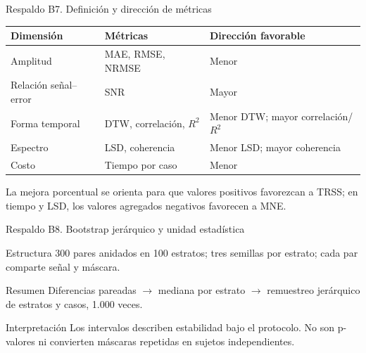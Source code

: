 \documentclass[aspectratio=169,10pt]{beamer}
\begin{document}
\begin{frame}{Respaldo B7. Definición y dirección de métricas}
\small
\begin{tabular}{@{}lll@{}}
\toprule
\textbf{Dimensión} & \textbf{Métricas} & \textbf{Dirección favorable}\\
\midrule
Amplitud & MAE, RMSE, NRMSE & Menor\\
Relación señal--error & SNR & Mayor\\
Forma temporal & DTW, correlación, $R^2$ & Menor DTW; mayor correlación/$R^2$\\
Espectro & LSD, coherencia & Menor LSD; mayor coherencia\\
Costo & Tiempo por caso & Menor\\
\bottomrule
\end{tabular}
\vspace{0.6em}
La mejora porcentual se orienta para que valores positivos favorezcan a TRSS; en tiempo y LSD, los valores agregados negativos favorecen a MNE.
\end{frame}

\begin{frame}{Respaldo B8. Bootstrap jerárquico y unidad estadística}
\begin{block}{Estructura}
300 pares anidados en 100 estratos; tres semillas por estrato; cada par comparte señal y máscara.
\end{block}
\begin{block}{Resumen}
Diferencias pareadas $\rightarrow$ mediana por estrato $\rightarrow$ remuestreo jerárquico de estratos y casos, 1.000 veces.
\end{block}
\begin{alertblock}{Interpretación}
Los intervalos describen estabilidad bajo el protocolo. No son p-valores ni convierten máscaras repetidas en sujetos independientes.
\end{alertblock}
\end{frame}
\end{document}
